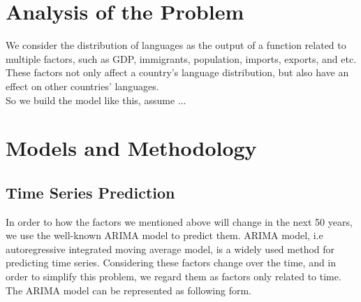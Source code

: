 \documentclass{mcmthesis}
\begin{document}





\section{Analysis of the Problem}
  \indent \indent We consider the distribution of languages as the output of a function related to multiple factors, such as GDP, immigrants, population, imports, exports, and etc. These factors not only affect a country's language distribution, but also have an effect on other countries' languages. \\
  \indent So we build the model like this, assume ...

\section{Models and Methodology}
  \subsection{Time Series Prediction}
  \indent \indent In order to how the factors we mentioned above will change in the next 50 years, we use the well-known ARIMA model to predict them. ARIMA model, i.e autoregressive integrated moving average model, is a widely used method for predicting time series. Considering these factors change over the time, and in order to simplify this problem, we regard them as factors only related to time. The ARIMA model can be represented as following form.
\end{document}
